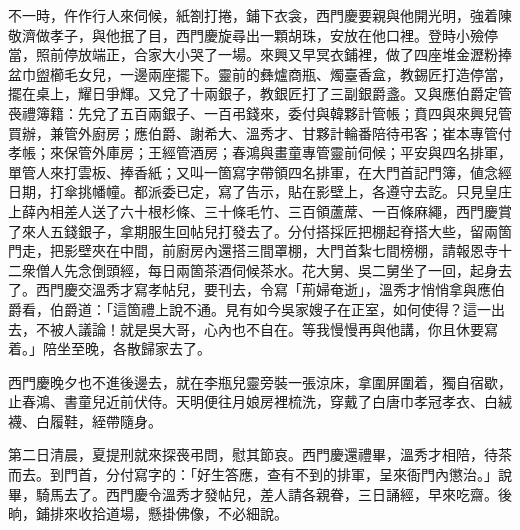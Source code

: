 不一時，仵作行人來伺候，紙劄打捲，鋪下衣衾，西門慶要親與他開光明，強着陳敬濟做孝子，{}{}與他抿了目，西門慶旋尋出一顆胡珠，安放在他口裡。登時小殮停當，照前停放端正，合家大小哭了一場。來興又早冥衣鋪裡，做了四座堆金瀝粉捧盆巾盥櫛毛女兒，一邊兩座擺下。靈前的彝爐商瓶、燭臺香盒，教錫匠打造停當，擺在桌上，耀日爭輝。又兌了十兩銀子，教銀匠打了三副銀爵盞。又與應伯爵定管䘮禮簿籍：先兌了五百兩銀子、一百弔錢來，委付與韓夥計管帳；賁四與來興兒管買辦，兼管外廚房；應伯爵、謝希大、溫秀才、甘夥計輪番陪待弔客；崔本專管付孝帳；來保管外庫房；王經管酒房；春鴻與畫童專管靈前伺候；平安與四名排軍，單管人來打雲板、捧香紙；又叫一箇寫字帶領四名排軍，在大門首記門簿，値念經日期，打傘挑幡幢。都派委已定，寫了告示，貼在影壁上，各遵守去訖。只見皇庄上薛內相差人送了六十根杉條、三十條毛竹、三百領蘆蓆、一百條麻繩，西門慶賞了來人五錢銀子，拿期服生回帖兒打發去了。分付搭採匠把棚起脊搭大些，留兩箇門走，把影壁夾在中間，前廚房內還搭三間罩棚，大門首紮七間榜棚，請報恩寺十二衆僧人先念倒頭經，每日兩箇茶酒伺候茶水。花大舅、吳二舅坐了一回，起身去了。西門慶交溫秀才寫孝帖兒，要刊去，令寫「荊婦奄逝」，溫秀才悄悄拿與應伯爵看，伯爵道：「這箇禮上說不通。見有如今吳家嫂子在正室，如何使得？{}這一出去，不被人議論！就是吳大哥，心內也不自在。等我慢慢再與他講，你且休要寫着。」陪坐至晚，各散歸家去了。

西門慶晚夕也不進後邊去，就在李瓶兒靈旁裝一張涼床，拿圍屏圍着，獨自宿歇，止春鴻、書童兒近前伏侍。天明便往月娘房裡梳洗，穿戴了白唐巾孝冠孝衣、白絨襪、白履鞋，絰帶隨身。

第二日清晨，夏提刑就來探䘮弔問，慰其節哀。西門慶還禮畢，溫秀才相陪，待茶而去。到門首，分付寫字的：「好生答應，查有不到的排軍，呈來衙門內懲治。」說畢，騎馬去了。西門慶令溫秀才發帖兒，差人請各親眷，三日誦經，早來吃齋。後晌，鋪排來收拾道場，懸掛佛像，不必細說。

